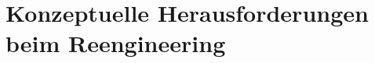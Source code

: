 \chapter{Konzeptuelle Herausforderungen beim Reengineering}
\label{ch:herausforderungen}
    
    
    
    